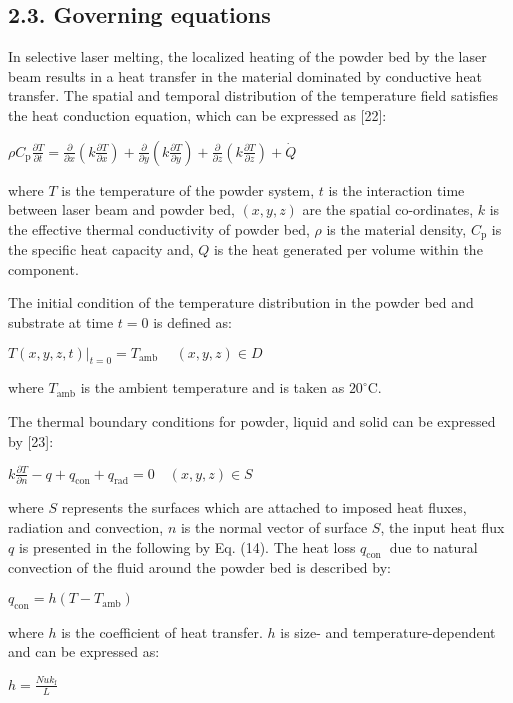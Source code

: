 \documentclass[10pt]{article}
\begin{document}
\subsection*{2.3. Governing equations}
In selective laser melting, the localized heating of the powder bed by the laser beam results in a heat transfer in the material dominated by conductive heat transfer. The spatial and temporal distribution of the temperature field satisfies the heat conduction equation, which can be expressed as [22]:

$\rho C_{\mathrm{p}} \frac{\partial T}{\partial t}=\frac{\partial}{\partial x}\left(k \frac{\partial T}{\partial x}\right)+\frac{\partial}{\partial y}\left(k \frac{\partial T}{\partial y}\right)+\frac{\partial}{\partial z}\left(k \frac{\partial T}{\partial z}\right)+\dot{Q}$

where $T$ is the temperature of the powder system, $t$ is the interaction time between laser beam and powder bed, $(x, y, z)$ are the spatial co-ordinates, $k$ is the effective thermal conductivity of powder bed, $\rho$ is the material density, $C_{\mathrm{p}}$ is the specific heat capacity and, $Q$ is the heat generated per volume within the component.

The initial condition of the temperature distribution in the powder bed and substrate at time $t=0$ is defined as:

$\left.T(x, y, z, t)\right|_{t=0}=T_{\text {amb }} \quad(x, y, z) \in D$

where $T_{\mathrm{amb}}$ is the ambient temperature and is taken as $20^{\circ} \mathrm{C}$.

The thermal boundary conditions for powder, liquid and solid can be expressed by [23]:

$k \frac{\partial T}{\partial n}-q+q_{\mathrm{con}}+q_{\mathrm{rad}}=0 \quad(x, y, z) \in S$

where $S$ represents the surfaces which are attached to imposed heat fluxes, radiation and convection, $n$ is the normal vector of surface $S$, the input heat flux $q$ is presented in the following by Eq. (14). The heat loss $q_{\text {con }}$ due to natural convection of the fluid around the powder bed is described by:

$q_{\mathrm{con}}=h\left(T-T_{\mathrm{amb}}\right)$

where $h$ is the coefficient of heat transfer. $h$ is size- and temperature-dependent and can be expressed as:

$h=\frac{N u k_{\mathrm{f}}}{L}$
\end{document}
